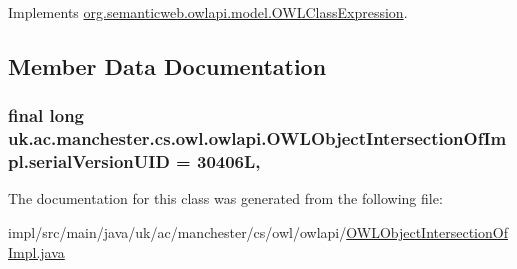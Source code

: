 Implements \hyperlink{interfaceorg_1_1semanticweb_1_1owlapi_1_1model_1_1_o_w_l_class_expression_a41cee339da2f9fc98508239ff8dc04a4}{org.\-semanticweb.\-owlapi.\-model.\-O\-W\-L\-Class\-Expression}.



\subsection{Member Data Documentation}
\hypertarget{classuk_1_1ac_1_1manchester_1_1cs_1_1owl_1_1owlapi_1_1_o_w_l_object_intersection_of_impl_abf095956d58990f3c115ddff6da529c9}{
\subsubsection[{serial\-Version\-U\-I\-D}]{\setlength{\rightskip}{0pt plus 5cm}final long uk.\-ac.\-manchester.\-cs.\-owl.\-owlapi.\-O\-W\-L\-Object\-Intersection\-Of\-Impl.\-serial\-Version\-U\-I\-D = 30406\-L\hspace{0.3cm}{\ttfamily [static]}, {\ttfamily [private]}}}\label{classuk_1_1ac_1_1manchester_1_1cs_1_1owl_1_1owlapi_1_1_o_w_l_object_intersection_of_impl_abf095956d58990f3c115ddff6da529c9}


The documentation for this class was generated from the following file\-:\begin{DoxyCompactItemize}
\item 
impl/src/main/java/uk/ac/manchester/cs/owl/owlapi/\hyperlink{_o_w_l_object_intersection_of_impl_8java}{O\-W\-L\-Object\-Intersection\-Of\-Impl.\-java}\end{DoxyCompactItemize}
